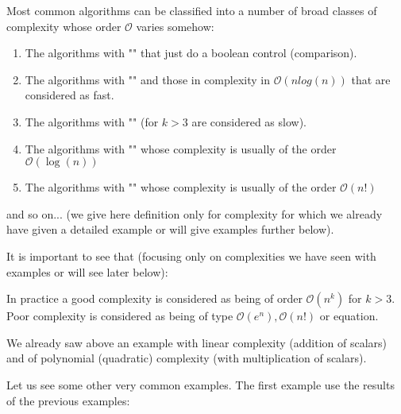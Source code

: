 Most common algorithms can be classified into a number of broad classes of complexity whose order $\mathcal{O}$ varies somehow:
	\begin{enumerate}
		\item The algorithms with "" that just do a boolean control (comparison).
		
		\item The algorithms with "" and those in complexity in $\mathcal{O} (n log (n))$ that are considered as fast.
		
		\item The algorithms with "" (for $k>3$ are considered as slow).
		
		\item The algorithms with "" whose complexity is usually of the order $\mathcal{O}(\log (n))$
		
		\item The algorithms with "" whose complexity is usually of the order $\mathcal{O}(n!)$
	\end{enumerate}
and so on... (we give here definition only for complexity for which we already have given a detailed example or will give examples further below).

It is important to see that (focusing only on complexities we have seen with examples or will see later below):
	

	\begin{tcolorbox}[title=Remark,colframe=black,arc=10pt]
In practice a good complexity is considered as being of order $\mathcal{O}(n^k)$ for $k>3$. Poor complexity is considered as being of type $\mathcal{O}(e^n),\mathcal{O}(n!)$ or equation.
	\end{tcolorbox}

We already saw above an example with linear complexity (addition of scalars) and of polynomial (quadratic) complexity (with multiplication of scalars).


Let us see some other very common examples. The first example use the results of the previous examples:

